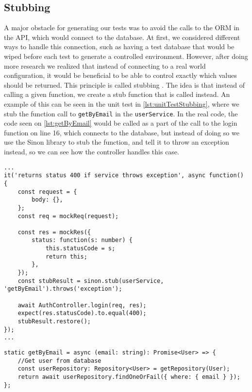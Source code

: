 \subsection{Stubbing}
A major obstacle for generating our tests was to avoid the calls to the ORM in the API, which would connect to the database.
At first, we considered different ways to handle this connection, such as having a test database that would be wiped before each test to generate a controlled environment.
However, after doing more research we realized that instead of connecting to a real world configuration, it would be beneficial to be able to control exactly which values should be returned.
This principle is called stubbing \cite{SoftwareTesting}.
The idea is that instead of calling a given function, we create a stub function that is called instead.
An example of this can be seen in the unit test in \autoref{lst:unitTestStubbing}, where we stub the function call to \texttt{getByEmail} in the \texttt{userService}.
In the real code, the code seen on \autoref{lst:getByEmail} would be called as a part of the call to the login function on line 16, which connects to the database, but instead of doing so we use the Sinon library to stub the function, and tell it to throw an exception instead, so we can see how the controller handles this case.

\begin{lstlisting}[caption={Unit test with stubbing},label={lst:unitTestStubbing}]
...
it('returns status 400 if service throws exception', async function() {
    const request = {
        body: {},
    };
    const req = mockReq(request);

    const res = mockRes({
        status: function(s: number) {
            this.statusCode = s;
            return this;
        },
    });
    const stubResult = sinon.stub(userService, 'getByEmail').throws('exception');

    await AuthController.login(req, res);
    expect(res.statusCode).to.equal(400);
    stubResult.restore();
});
...
\end{lstlisting}

\begin{lstlisting}[caption={Actual getByEmail function},label={lst:getByEmail}]
static getByEmail = async (email: string): Promise<User> => {
    //Get user from database
    const userRepository: Repository<User> = getRepository(User);
    return await userRepository.findOneOrFail({ where: { email } });
};
\end{lstlisting}

